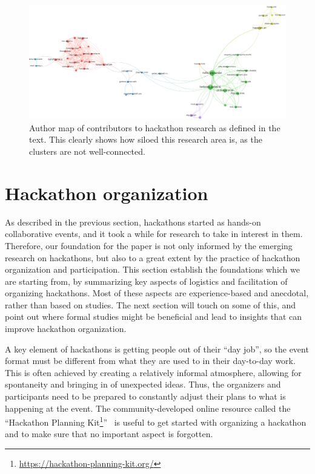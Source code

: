 \documentclass{ieeeaccess}
\begin{document}
\begin{figure}
\centering
\includegraphics[width=\linewidth]{coauthor.png}
\caption{Author map of contributors to hackathon research as defined in the text. This clearly shows how siloed this research area is, as the clusters are not well-connected.}
\label{fig:authors}
\vspace{-10pt}
\end{figure}

\section{Hackathon organization}
\label{hackathonOrganization}
As described in the previous section, hackathons started as hands-on collaborative events, and it took a while for research to take in interest in them. 
Therefore, our foundation for the paper is not only informed by the emerging research on hackathons, but also to a great extent by the practice of hackathon organization and participation.
This section establish the foundations which we are starting from, by summarizing key aspects of logistics and facilitation of organizing hackathons. 
Most of these aspects are experience-based and anecdotal, rather than based on studies. 
The next section will touch on some of this, and point out where formal studies might be beneficial and lead to insights that can improve hackathon organization.

A key element of hackathons is getting people out of their ``day job'', so the event format must be different from what they are used to in their day-to-day work. 
This is often achieved by creating a relatively informal atmosphere, allowing for spontaneity and bringing in of unexpected ideas. 
Thus, the organizers and participants need to be prepared to constantly adjust their plans to what is happening at the event. 
The community-developed online resource called the ``Hackathon Planning Kit\footnote{\href{https://hackathon-planning-kit.org/}{https://hackathon-planning-kit.org/}}''~\cite{nolte2020organize} is useful to get started with organizing a hackathon and to make sure that no important aspect is forgotten. 
\end{document}
